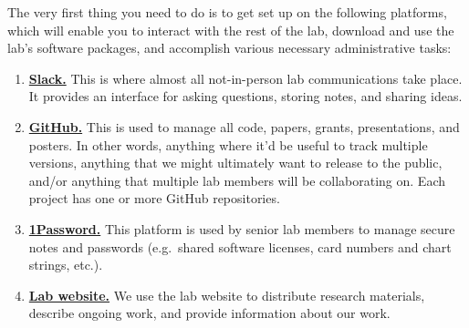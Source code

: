 \documentclass{tufte-book} %
\begin{document}
\noindent
The very first thing you need to do is to get set up on the following
platforms, which will enable you to interact with the rest of the lab,
download and use the lab's software packages, and accomplish various
necessary administrative tasks: 
\begin{enumerate}
\item \href{https://context-lab.slack.com}{\textbf{Slack.}}  This is where
  almost all not-in-person lab communications take place.  It provides
  an interface for asking questions, storing notes, and sharing
  ideas.
\item \href{https://www.github.com}{\textbf{GitHub.}}
    This is used
  to manage all code, papers, grants, presentations, and posters.  In
  other words, anything where it'd be useful to track multiple
  versions, anything that we might ultimately want to release to the
  public, and/or anything that multiple lab members will be
  collaborating on.  Each project has one or more GitHub repositories.
\item \href{https://1password.com/}{\textbf{1Password.}}
   This platform is used by senior
  lab members to manage secure notes and passwords (e.g.\ shared
  software licenses, card numbers and chart strings, etc.).
\item \href{http://www.context-lab.com/}{\textbf{Lab website.}}
   We use the lab website to
  distribute research materials, describe ongoing work, and provide
  information about our work.
\end{enumerate}
\end{document}
